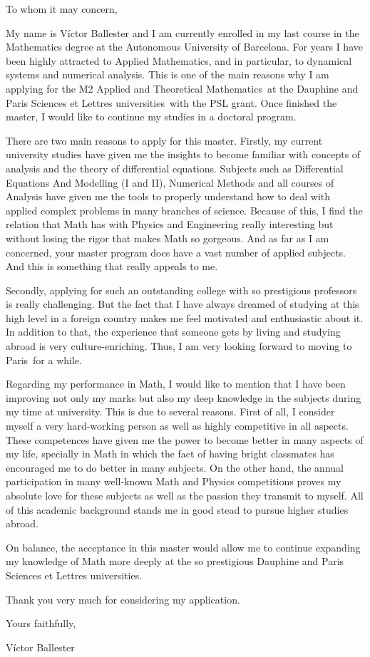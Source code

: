 \documentclass{letter}
\date{\today}
\newcommand{\master}{M2 Applied and Theoretical Mathematics}
\newcommand{\uni}{Dauphine and Paris Sciences et Lettres universities}
\newcommand{\city}{Paris}
\newcommand{\scholar}{PSL grant}
\begin{document}
\begin{letter}
  \hfill

  \opening{To whom it may concern,}
  \medskip

  My name is Víctor Ballester and I am currently enrolled in my last course in the Mathematics degree at the Autonomous University of Barcelona. For years I have been highly attracted to Applied Mathematics, and in particular, to dynamical systems and numerical analysis. This is one of the main reasons why I am applying for the \master\ at the \uni\ with the \scholar. Once finished the master, I would like to continue my studies in a doctoral program.

  There are two main reasons to apply for this master. Firstly, my current university studies have given me the insights to become familiar with concepts of analysis and the theory of differential equations. Subjects such as Differential Equations And Modelling (I and II), Numerical Methods and all courses of Analysis have given me the tools to properly understand how to deal with applied complex problems in many branches of science. Because of this, I find the relation that Math has with Physics and Engineering really interesting but without losing the rigor that makes Math so gorgeous. And as far as I am concerned, your master program does have a vast number of applied subjects. And this is something that really appeals to me.

  Secondly, applying for such an outstanding college with so prestigious professors is really challenging. But the fact that I have always dreamed of studying at this high level in a foreign country makes me feel motivated and enthusiastic about it. In addition to that, the experience that someone gets by living and studying abroad is very culture-enriching. Thus, I am very looking forward to moving to \city\ for a while.

  Regarding my performance in Math, I would like to mention that I have been improving not only my marks but also my deep knowledge in the subjects during my time at university. This is due to several reasons. First of all, I consider myself a very hard-working person as well as highly competitive in all aspects. These competences have given me the power to become better in many aspects of my life, specially in Math in which the fact of having bright classmates has encouraged me to do better in many subjects. On the other hand, the annual participation in many well-known Math and Physics competitions proves my absolute love for these subjects as well as the passion they transmit to myself. All of this academic background stands me in good stead to pursue higher studies abroad.


  On balance, the acceptance in this master would allow me to continue expanding my knowledge of Math more deeply at the so prestigious \uni.

  Thank you very much for considering my application.
  \bigskip

  Yours faithfully,

  Víctor Ballester

\end{letter}
\end{document}
